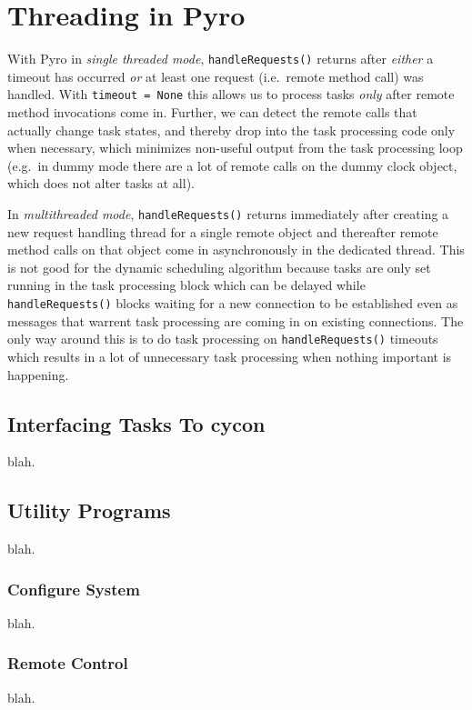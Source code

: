 \documentclass[11pt,a4paper]{article}
\begin{document}
\section{Threading in Pyro} \label{pyro-appendix}

With Pyro in {\em single threaded mode}, \verb#handleRequests()# returns
after {\em either} a timeout has occurred {\em or} at least one request
(i.e.\ remote method call) was handled. With \verb#timeout = None# this
allows us to process tasks {\em only} after remote method invocations
come in.  Further, we can detect the remote calls that actually change
task states, and thereby drop into the task processing code only when
necessary, which minimizes non-useful output from the task processing
loop (e.g.\ in dummy mode there are a lot of remote calls on the dummy
clock object, which does not alter tasks at all). 

In {\em multithreaded mode}, \verb#handleRequests()# returns immediately
after creating a new request handling thread for a single remote object
and thereafter remote method calls on that object come in asynchronously
in the dedicated thread. This is not good for the dynamic scheduling
algorithm because tasks are only set running in the task processing
block which can be delayed while \verb#handleRequests()# blocks waiting
for a new connection to be established even as messages that warrent
task processing are coming in on existing connections. The only way
around this is to do task processing on \verb#handleRequests()# timeouts
which results in a lot of unnecessary task processing when nothing
important is happening.


\subsection{Interfacing Tasks To cycon}
blah.

\subsection{Utility Programs}
blah.

\subsubsection{Configure System}
blah.

\subsubsection{Remote Control}
blah.
\end{document}
